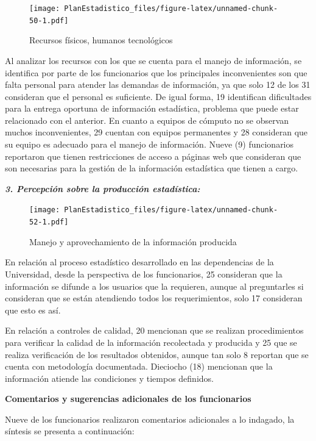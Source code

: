 \documentclass[
]{book}
\begin{document}
\begin{figure}
\centering
\texttt{[image: PlanEstadistico\_files/figure-latex/unnamed-chunk-50-1.pdf]}
\caption{\label{fig:unnamed-chunk-50}Recursos físicos, humanos tecnológicos}
\end{figure}

Al analizar los recursos con los que se cuenta para el
manejo de información, se identifica por parte de los funcionarios que los principales inconvenientes son que falta personal para atender las demandas de
información, ya que solo 12 de los 31 consideran que el personal es suficiente. De igual forma, 19 identifican dificultades para la entrega oportuna de información estadística, problema que puede estar
relacionado con el anterior. En cuanto a equipos de cómputo no se observan muchos inconvenientes, 29 cuentan con equipos permanentes y 28 consideran que su equipo es adecuado para el manejo de información. Nueve (9) funcionarios reportaron que tienen restricciones de acceso a páginas web que consideran que son necesarias para la gestión de la información estadística que tienen a cargo.

\textbf{\emph{3. Percepción sobre la producción estadística:}}

\begin{figure}
\centering
\texttt{[image: PlanEstadistico\_files/figure-latex/unnamed-chunk-52-1.pdf]}
\caption{\label{fig:unnamed-chunk-52}Manejo y aprovechamiento de la información producida}
\end{figure}

En relación al proceso estadístico desarrollado en las dependencias de la Universidad, desde la perspectiva de los funcionarios, 25 consideran que la información se difunde a los usuarios que la requieren, aunque al preguntarles si consideran que se están atendiendo todos los requerimientos, solo 17 consideran que esto es así.

En relación a controles de calidad, 20 mencionan que se realizan procedimientos para verificar la calidad de la información recolectada y producida y 25 que se realiza verificación de los resultados obtenidos, aunque tan solo 8 reportan que se cuenta con metodología documentada. Dieciocho (18) mencionan que la información atiende las condiciones y tiempos definidos.

\textbf{Comentarios y sugerencias adicionales de los funcionarios}

Nueve de los funcionarios realizaron comentarios adicionales a lo indagado, la síntesis se presenta a continuación:
\end{document}
